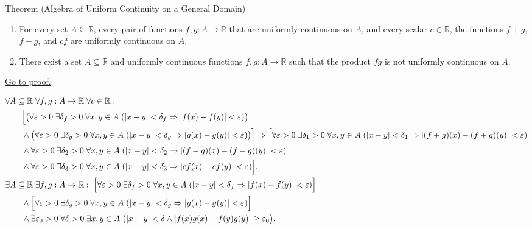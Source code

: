 \begin{theorembox}{Theorem (Algebra of Uniform Continuity on a General Domain)}
\begin{theorem}
\label{thm:algebra-of-uniform-continuity-general}
\begin{enumerate}[label=(\alph*)]
  \item For every set $A \subseteq \mathbb{R}$, every pair of functions $f,g : A \to \mathbb{R}$ that are uniformly continuous on $A$, and every scalar $c \in \mathbb{R}$, the functions $f+g$, $f-g$, and $cf$ are uniformly continuous on $A$.
  \item There exist a set $A \subseteq \mathbb{R}$ and uniformly continuous functions $f,g : A \to \mathbb{R}$ such that the product $fg$ is not uniformly continuous on $A$.
\end{enumerate}
\hyperref[prf:algebra-of-uniform-continuity-general]{Go to proof.}
\end{theorem}
\end{theorembox}

\begin{remark*}
\[
\begin{aligned}
&\forall A \subseteq \mathbb{R}\; \forall f,g : A \to \mathbb{R}\; \forall c \in \mathbb{R}:\\
&\qquad
\Bigl[
\bigl(\forall \varepsilon>0\;\exists \delta_f>0\;\forall x,y\in A\;(|x-y|<\delta_f\Rightarrow |f(x)-f(y)|<\varepsilon)\bigr)\\
&\qquad\land
\bigl(\forall \varepsilon>0\;\exists \delta_g>0\;\forall x,y\in A\;(|x-y|<\delta_g\Rightarrow |g(x)-g(y)|<\varepsilon)\bigr)
\Bigr]
\Rightarrow
\Bigl[
\forall \varepsilon>0\;\exists \delta_1>0\;\forall x,y\in A\;(|x-y|<\delta_1\Rightarrow |(f+g)(x)-(f+g)(y)|<\varepsilon)\\
&\qquad\land
\forall \varepsilon>0\;\exists \delta_2>0\;\forall x,y\in A\;(|x-y|<\delta_2\Rightarrow |(f-g)(x)-(f-g)(y)|<\varepsilon)\\
&\qquad\land
\forall \varepsilon>0\;\exists \delta_3>0\;\forall x,y\in A\;(|x-y|<\delta_3\Rightarrow |cf(x)-cf(y)|<\varepsilon)
\Bigr],\\
&\exists A \subseteq \mathbb{R}\; \exists f,g : A \to \mathbb{R}:\;
\Bigl[
\forall \varepsilon>0\;\exists \delta_f>0\;\forall x,y\in A\;(|x-y|<\delta_f\Rightarrow |f(x)-f(y)|<\varepsilon)
\Bigr]\\
&\qquad\land
\Bigl[
\forall \varepsilon>0\;\exists \delta_g>0\;\forall x,y\in A\;(|x-y|<\delta_g\Rightarrow |g(x)-g(y)|<\varepsilon)
\Bigr]\\
&\qquad\land
\exists \varepsilon_0>0\;\forall \delta>0\;\exists x,y\in A\;
\bigl(|x-y|<\delta\land |f(x)g(x)-f(y)g(y)|\ge\varepsilon_0\bigr).
\end{aligned}
\]
\end{remark*}


